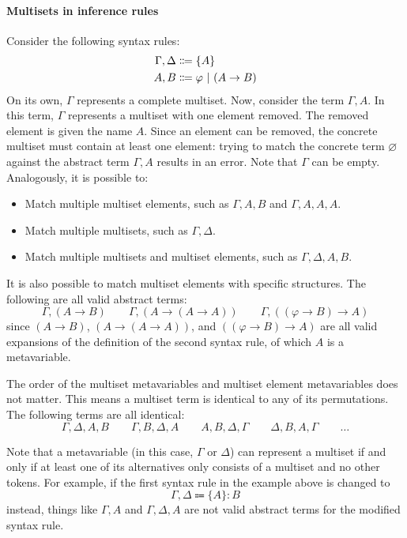 \paragraph{Multisets in inference rules}
\label{inference:multisets}
Consider the following syntax rules:
\begin{align*}
    \Gamma, \Delta &\Coloneqq \{ A \} \\
    A, B &\Coloneqq \varphi \ |\  (A \to B)
\end{align*}
On its own, $\Gamma$ represents a complete multiset. Now, consider the term $\Gamma, A$. In this term, $\Gamma$ represents a multiset with one element removed. The removed element is given the name $A$. Since an element can be removed, the concrete multiset must contain at least one element: trying to match the concrete term $\varnothing$ against the abstract term $\Gamma, A$ results in an error. Note that $\Gamma$ can be empty. Analogously, it is possible to:
\begin{itemize}
    \item Match multiple multiset elements, such as $\Gamma, A, B$ and $\Gamma, A, A, A$.
    \item Match multiple multisets, such as $\Gamma, \Delta$.
    \item Match multiple multisets and multiset elements, such as $\Gamma, \Delta, A, B$.
\end{itemize}

It is also possible to match multiset elements with specific structures. The following are all valid abstract terms:
\[
    \Gamma, (A \to B) \qquad \Gamma, (A \to (A \to A)) \qquad \Gamma, ((\varphi \to B) \to A)
\]
since $(A \to B)$, $(A \to (A \to A))$, and $((\varphi \to B) \to A)$ are all valid expansions of the definition of the second syntax rule, of which $A$ is a metavariable.

The order of the multiset metavariables and multiset element metavariables does not matter. This means a multiset term is identical to any of its permutations. The following terms are all identical:
\[
    \Gamma, \Delta, A, B \qquad \Gamma, B, \Delta, A \qquad A, B, \Delta, \Gamma \qquad \Delta, B, A, \Gamma \qquad \ldots
\]

Note that a metavariable (in this case, $\Gamma$ or $\Delta$) can represent a multiset if and only if at least one of its alternatives only consists of a multiset and no other tokens. For example, if the first syntax rule in the example above is changed to
\[
    \Gamma, \Delta \Coloneqq \{ A \}: B
\]
instead, things like $\Gamma, A$ and $\Gamma, \Delta, A$ are not valid abstract terms for the modified syntax rule.

